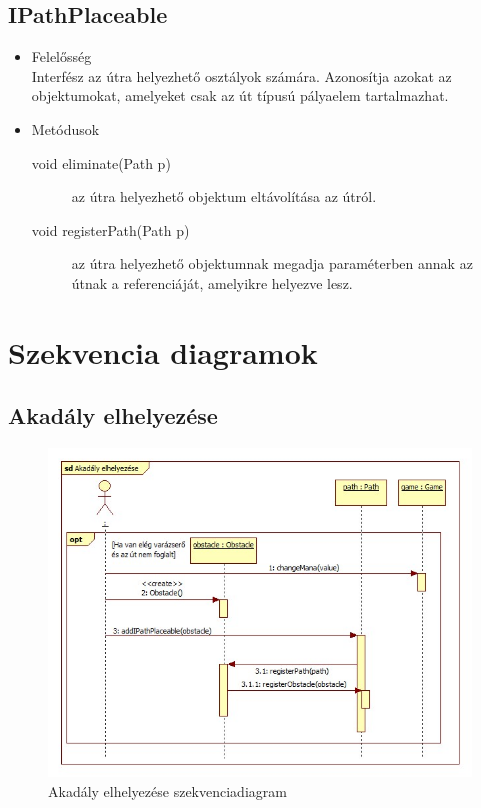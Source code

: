 \subsection{IPathPlaceable}
\begin{itemize}
\item Felelősség\\
Interfész az útra helyezhető osztályok számára. Azonosítja azokat az objektumokat, amelyeket csak az út típusú pályaelem tartalmazhat.

\item Metódusok\\
	\begin{description}
		\item[void eliminate(Path p)] az útra helyezhető objektum eltávolítása az útról.
\item[void registerPath(Path p)] az útra helyezhető objektumnak megadja paraméterben annak az útnak a referenciáját, amelyikre helyezve lesz.



		
	\end{description}
\end{itemize}


\section{Szekvencia diagramok}
\subsection{Akadály elhelyezése}
\begin{figure}[H]
\begin{center}
\includegraphics[width=17cm]{chapters/chapter04/images/Akadaly_elhelyezese.jpg}
\caption{Akadály elhelyezése szekvenciadiagram}
\label{fig:Akadály_elhelyezése}
\end{center}
\end{figure}

